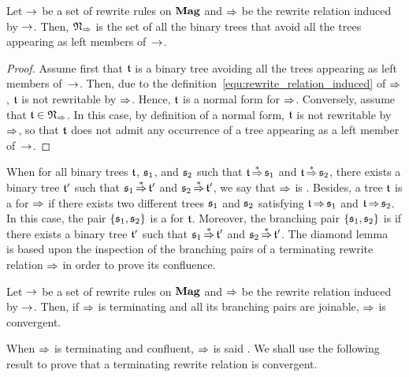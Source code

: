 \begin{Lemma} \label{lem:normal_forms_avoiding}
    Let $\operatorname{\to}$ be a set of rewrite rules on $\mathbf{Mag}$ and $\operatorname{\Rightarrow}$ be
    the rewrite relation induced by $\operatorname{\to}$. Then,
    $\mathfrak{N}_{\operatorname{\Rightarrow}}$ is the set of all the binary trees that
    avoid all the trees appearing as left members of~$\operatorname{\to}$.
\end{Lemma}
\begin{proof}
    Assume first that $\mathfrak{t}$ is a binary tree avoiding all the trees
    appearing as left members of~$\operatorname{\to}$. Then, due to the
    definition~\eqref{equ:rewrite_relation_induced} of $\operatorname{\Rightarrow}$,
    $\mathfrak{t}$ is not rewritable by $\operatorname{\Rightarrow}$. Hence, $\mathfrak{t}$ is a normal
    form for $\operatorname{\Rightarrow}$. Conversely, assume that
    $\mathfrak{t} \in \mathfrak{N}_{\operatorname{\Rightarrow}}$. In this case, by definition
    of a normal form, $\mathfrak{t}$ is not rewritable by $\operatorname{\Rightarrow}$, so that
    $\mathfrak{t}$ does not admit any occurrence of a tree appearing as a left
    member of~$\operatorname{\to}$.
\end{proof}
\medbreak

When for all binary trees $\mathfrak{t}$, $\mathfrak{s}_1$, and $\mathfrak{s}_2$ such that
$\mathfrak{t} \operatorname{\overset{\ast}{\operatorname{\Rightarrow}}} \mathfrak{s}_1$ and $\mathfrak{t} \operatorname{\overset{\ast}{\operatorname{\Rightarrow}}} \mathfrak{s}_2$, there
exists a binary tree $\mathfrak{t}'$ such that $\mathfrak{s}_1 \operatorname{\overset{\ast}{\operatorname{\Rightarrow}}} \mathfrak{t}'$ and
$\mathfrak{s}_2 \operatorname{\overset{\ast}{\operatorname{\Rightarrow}}} \mathfrak{t}'$, we say that $\operatorname{\Rightarrow}$ is
. Besides, a tree $\mathfrak{t}$ is a  for
$\operatorname{\Rightarrow}$ if there exists two different trees $\mathfrak{s}_1$ and $\mathfrak{s}_2$
satisfying $\mathfrak{t} \operatorname{\Rightarrow} \mathfrak{s}_1$ and $\mathfrak{t} \operatorname{\Rightarrow} \mathfrak{s}_2$. In
this case, the pair $\{\mathfrak{s}_1, \mathfrak{s}_2\}$ is a  for
$\mathfrak{t}$. Moreover, the branching pair $\{\mathfrak{s}_1, \mathfrak{s}_2\}$ is
 if there exists a binary tree $\mathfrak{t}'$ such that
$\mathfrak{s}_1 \operatorname{\overset{\ast}{\operatorname{\Rightarrow}}} \mathfrak{t}'$ and $\mathfrak{s}_2 \operatorname{\overset{\ast}{\operatorname{\Rightarrow}}} \mathfrak{t}'$. The
diamond lemma~\cite{New42} is based upon the inspection of the branching
pairs of a terminating rewrite relation $\operatorname{\Rightarrow}$ in order to prove
its confluence.
\medbreak

\begin{Lemma} \label{lem:diamond_lemma}
    Let $\operatorname{\to}$ be a set of rewrite rules on $\mathbf{Mag}$ and $\operatorname{\Rightarrow}$ be
    the rewrite relation induced by $\operatorname{\to}$. Then, if $\operatorname{\Rightarrow}$ is
    terminating and all its branching pairs are joinable, $\operatorname{\Rightarrow}$
    is convergent.
\end{Lemma}
\medbreak

When $\operatorname{\Rightarrow}$ is terminating and confluent, $\operatorname{\Rightarrow}$ is said
. We shall use the following result to prove that
a terminating rewrite relation is convergent.
\medbreak

